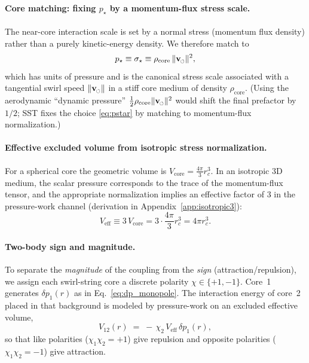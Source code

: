 \documentclass[pdflatex,sn-mathphys-num]{revtex4-2}
\newcommand{\swirlarrow}{\mathchoice{\mkern-2mu\scriptstyle\boldsymbol{\circlearrowleft}}{\mkern-2mu\scriptstyle\boldsymbol{\circlearrowleft}}{\mkern-2mu\scriptscriptstyle\boldsymbol{\circlearrowleft}}{\mkern-2mu\scriptscriptstyle\boldsymbol{\circlearrowleft}}}
\newcommand{\rhocore}{\rho_{\text{core}}}
\newcommand{\vswirl}{\mathbf{v}_{\swirlarrow}}
\newcommand{\vnorm}{\lVert \vswirl \rVert}
\providecommand{\rc}{r_c}
\begin{document}
    \paragraph{Core matching: fixing \(p_\star\) by a momentum-flux stress scale.}
        The near-core interaction scale is set by a normal stress (momentum flux density) rather than a purely kinetic-energy
        density. We therefore match to
        \begin{equation}
            p_\star \equiv \sigma_\star \equiv \rhocore\,\vnorm^2,
            \label{eq:pstar}
        \end{equation}
        which has units of pressure and is the canonical stress scale associated with a tangential swirl speed \(\vnorm\)
        in a stiff core medium of density \(\rhocore\).
        (Using the aerodynamic ``dynamic pressure'' \(\tfrac12\rhocore\vnorm^2\) would shift the final prefactor by \(1/2\);
        SST fixes the choice \eqref{eq:pstar} by matching to momentum-flux normalization.)

    \paragraph{Effective excluded volume from isotropic stress normalization.}
        For a spherical core the geometric volume is \(V_{\text{core}}=\tfrac{4\pi}{3}\rc^3\).
        In an isotropic 3D medium, the scalar pressure corresponds to the trace of the momentum-flux tensor,
        and the appropriate normalization implies an effective factor of \(3\) in the pressure-work channel
        (derivation in Appendix~\ref{app:isotropic3}):
        \begin{equation}
            V_{\text{eff}} \equiv 3\,V_{\text{core}} = 3\cdot \frac{4\pi}{3}\rc^3 = 4\pi \rc^3.
            \label{eq:Veff}
        \end{equation}

    \paragraph{Two-body sign and magnitude.}
        To separate the \emph{magnitude} of the coupling from the \emph{sign} (attraction/repulsion), we assign each
        swirl-string core a discrete polarity \(\chi\in\{+1,-1\}\).
        Core~1 generates \(\delta p_1(r)\) as in Eq.~\eqref{eq:dp_monopole}. The interaction energy of core~2 placed in that
        background is modeled by pressure-work on an excluded effective volume,
        \begin{equation}
            V_{12}(r) \;=\; -\,\chi_2\,V_{\text{eff}}\,\delta p_1(r),
            \label{eq:Vfromdp}
        \end{equation}
        so that like polarities (\(\chi_1\chi_2=+1\)) give repulsion and opposite polarities (\(\chi_1\chi_2=-1\)) give attraction.
\end{document}
